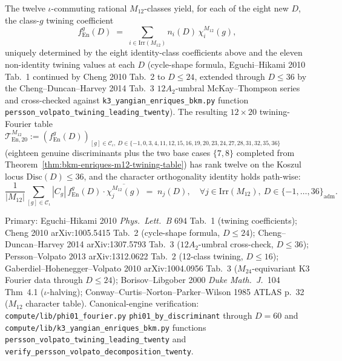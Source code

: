 \begin{theorem}
The twelve $\iota$-commuting rational $M_{12}$-classes yield, for each
of the eight new $D$, the class-$g$ twining coefficient
\begin{equation}
\label{eq:bkm-enriques-m12-twenty-virtual}
 f^g_{\mathrm{En}}(D)
 \;=\;
 \sum_{i\in\mathrm{Irr}(M_{12})} n_i(D)\,\chi_i^{M_{12}}(g),
\end{equation}
uniquely determined by the eight identity-class coefficients above and
the eleven non-identity twining values at each $D$
(cycle-shape formula, Eguchi--Hikami 2010 Tab.~1 continued by Cheng
2010 Tab.~2 to $D\leq 24$, extended through $D\leq 36$ by the
Cheng--Duncan--Harvey 2014 Tab.~3 $12A_2$-umbral McKay--Thompson
series and cross-checked against
\texttt{k3\_yangian\_enriques\_bkm.py} function
\texttt{persson\_volpato\_twining\_leading\_twenty}). The resulting
$12\times 20$ twining-Fourier table
$\mathcal{T}^{M_{12}}_{\mathrm{En},20} := (f^g_{\mathrm{En}}(D))_{[g]\in
\mathcal{C}_\iota,\, D\in\{-1,0,3,4,11,12,15,16,19,20,23,24,27,28,31,32,35,36\}}$
(eighteen genuine discriminants plus the two base cases $\{7, 8\}$
completed from
Theorem~\textup{\ref{thm:bkm-enriques-m12-twining-table}}) has rank
twelve on the Koszul locus $\mathrm{Disc}(D)\leq 36$, and the character
orthogonality identity holds path-wise:
\begin{equation}
\label{eq:bkm-enriques-m12-twenty-orthog}
 \frac{1}{|M_{12}|}\sum_{[g]\in\mathcal{C}_\iota}|C_g|\,
 f^g_{\mathrm{En}}(D)\cdot\overline{\chi_j^{M_{12}}(g)}
 \;=\;
 n_j(D),
 \quad\forall j\in\mathrm{Irr}(M_{12}),\ D\in\{-1,\ldots,36\}_{\mathrm{adm}}.
\end{equation}

Primary:
Eguchi--Hikami 2010 \emph{Phys.~Lett.~B} 694 Tab.~1 (twining coefficients);
Cheng 2010 arXiv:1005.5415 Tab.~2 (cycle-shape formula, $D\leq 24$);
Cheng--Duncan--Harvey 2014 arXiv:1307.5793 Tab.~3
($12A_2$-umbral cross-check, $D\leq 36$);
Persson--Volpato 2013 arXiv:1312.0622 Tab.~2 (12-class twining,
$D\leq 16$);
Gaberdiel--Hohenegger--Volpato 2010 arXiv:1004.0956 Tab.~3
($M_{24}$-equivariant K3 Fourier data through $D\leq 24$);
Borisov--Libgober 2000 \emph{Duke Math.~J.}~104 Thm~4.1
($\iota$-halving);
Conway--Curtis--Norton--Parker--Wilson 1985 ATLAS p.~32
($M_{12}$ character table). Canonical-engine verification:
\texttt{compute/lib/phi01\_fourier.py} \texttt{phi01\_by\_discriminant}
through $D = 60$ and
\texttt{compute/lib/k3\_yangian\_enriques\_bkm.py} functions
\texttt{persson\_volpato\_twining\_leading\_twenty} and
\texttt{verify\_persson\_volpato\_decomposition\_twenty}.
\end{theorem}

